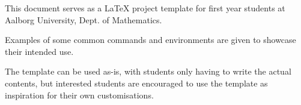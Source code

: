 

This document serves as a \LaTeX{} project template for first year students at Aalborg University, Dept. of Mathematics.

Examples of some common commands and environments are given to showcase their intended use.

The template can be used as-is, with students only having to write the actual contents, but interested students are encouraged to use the template as inspiration for their own customisations.
